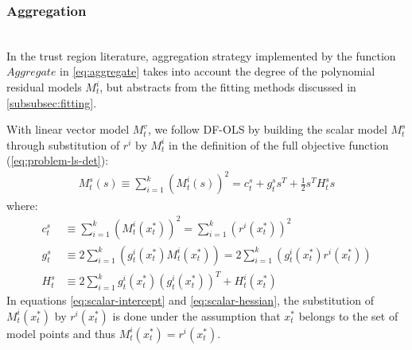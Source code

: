 \subsubsection{Aggregation}
\label{subsubsec:aggregation}
\hfill\\





In the trust region literature, aggregation strategy implemented by the function $Aggregate$ in \ref{eq:aggregate} takes into account the degree of the polynomial residual models $M_t^i$, but abstracts from the fitting methods discussed in \ref{subsubsec:fitting}.

With linear vector model $M_t^v$, we follow DF-OLS by building the scalar model $M_t^s$ through substitution of $r^i$ by $M_t^i$ in the definition of the full objective function (\ref{eq:problem-ls-det}):
\begin{align}
    M_t^s(s)\equiv\sum\limits_{i=1}^k(M_t^i(s))^2 =  c_t^s+g^s_ts^T+\frac{1}{2}s^TH^s_ts
\end{align}
where:
\begin{align}
    c_t^s &\equiv\sum\limits_{i=1}^k(M_t^i(x_t^*))^2 = \sum\limits_{i=1}^k(r^i(x_t^*))^2\label{eq:scalar-intercept}\\
     g^s_t&\equiv2\sum\limits_{i=1}^k(g_t^i(x_t^*)M_t^i(x_t^*))=2\sum\limits_{i=1}^k(g_t^i(x_t^*)r^i(x_t^*))\label{eq:scalar-gradient}\\
     H_t^s&\equiv2\sum\limits_{i=1}^kg_t^i(x_t^*)(g_t^i(x_t^*))^T+H_t^i(x_t^*)\label{eq:scalar-hessian}
\end{align}
In equations \ref{eq:scalar-intercept} and \ref{eq:scalar-hessian}, the substitution of $M_t^i(x_t^*)$ by $r^i(x_t^*)$ is done under the assumption that $x_t^*$ belongs to the set of model points and thus $M_t^i(x_t^*)=r^i(x_t^*)$.

